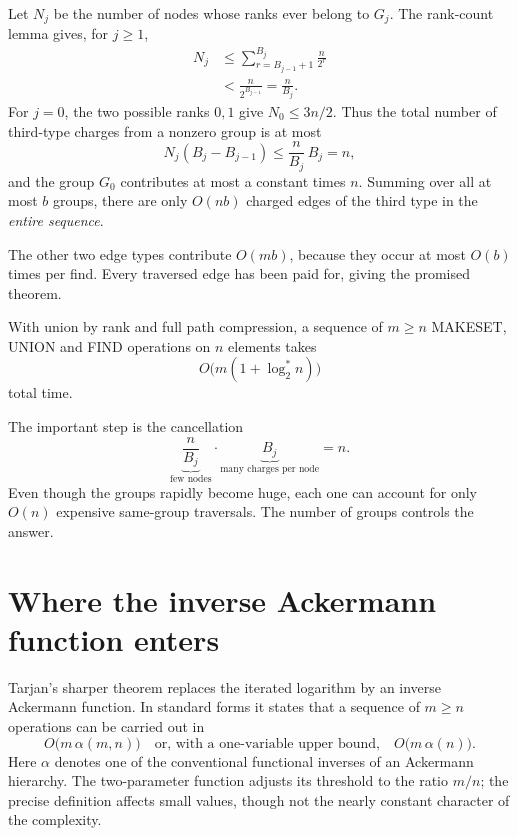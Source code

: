 Let \(N_j\) be the number of nodes whose ranks ever belong to \(G_j\). The rank-count lemma gives, for \(j\geq1\),
\begin{align*}
 N_j
 &\leq\sum_{r=B_{j-1}+1}^{B_j}\frac{n}{2^r}\\
 &<\frac{n}{2^{B_{j-1}}}
 =\frac{n}{B_j}.
\end{align*}
For \(j=0\), the two possible ranks \(0,1\) give \(N_0\leq3n/2\). Thus the total number of third-type charges from a nonzero group is at most
\[
 N_j(B_j-B_{j-1})
 \leq\frac{n}{B_j}\,B_j=n,
\]
and the group \(G_0\) contributes at most a constant times \(n\). Summing over all at most \(b\) groups, there are only \(O(nb)\) charged edges of the third type in the \emph{entire sequence}.

The other two edge types contribute \(O(mb)\), because they occur at most \(O(b)\) times per find. Every traversed edge has been paid for, giving the promised theorem.

\begin{theorem}
With union by rank and full path compression, a sequence of \(m\geq n\) MAKESET, UNION and FIND operations on \(n\) elements takes
\begin{equation}
 \boxed{O\bigl(m(1+\log_2^*n)\bigr)}
 \label{eq:N20261108-logstar}
\end{equation}
total time.
\end{theorem}

The important step is the cancellation
\[
 \underbrace{\frac{n}{B_j}}_{\text{few nodes}}
 \cdot
 \underbrace{B_j}_{\text{many charges per node}}
 =n.
\]
Even though the groups rapidly become huge, each one can account for only \(O(n)\) expensive same-group traversals. The number of groups controls the answer.

\section{Where the inverse Ackermann function enters}

Tarjan's sharper theorem replaces the iterated logarithm by an inverse Ackermann function. In standard forms it states that a sequence of \(m\geq n\) operations can be carried out in
\begin{equation}
 O\bigl(m\,\alpha(m,n)\bigr)
 \quad\text{or, with a one-variable upper bound,}\quad
 O\bigl(m\,\alpha(n)\bigr).
 \label{eq:N20261108-sharp}
\end{equation}
Here \(\alpha\) denotes one of the conventional functional inverses of an Ackermann hierarchy. The two-parameter function adjusts its threshold to the ratio \(m/n\); the precise definition affects small values, though not the nearly constant character of the complexity.

